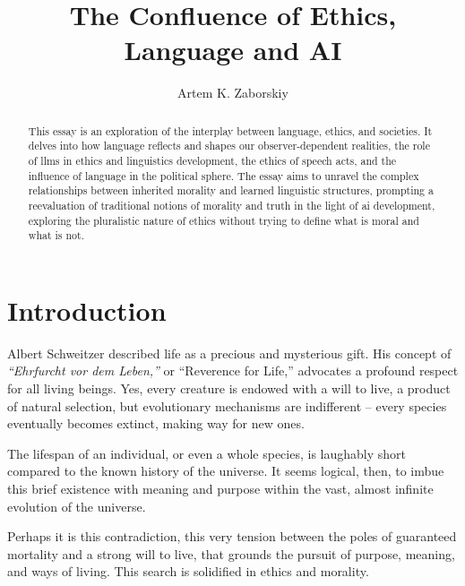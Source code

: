 \documentclass[11pt,a4]{article}
\begin{document}
\title{The Confluence of Ethics, Language and AI}

\author{Artem K. Zaborskiy}


\maketitle




\begin{abstract}



This essay is an exploration of the interplay between language, ethics,
and societies. It delves into how language reflects and shapes our
observer-dependent realities, the role of \glspl{llm} in ethics and
linguistics development, the ethics of speech acts, and the influence
of language in the political sphere. The essay aims to unravel the
complex relationships between inherited morality and learned linguistic
structures, prompting a reevaluation of traditional notions of
morality and truth in the light of \gls{ai} development,
exploring the pluralistic nature of ethics without trying
to define what is moral and what is not.
\end{abstract}

\newpage
\tableofcontents
\printglossaries



\newpage

\section{Introduction}

    Albert Schweitzer described life as a precious and mysterious
    gift\cite{Schweitzer}. His concept of \textit{“Ehrfurcht vor dem Leben,”}
    or “Reverence for Life,” advocates a profound respect for all living beings.
    Yes, every creature is endowed with a will to live, a product of
    natural selection, but evolutionary mechanisms are indifferent
    – every species eventually becomes extinct, making way for new ones.
    \par
    The lifespan of an individual, or even a whole species, is
    laughably short compared to the known history of the universe.
    It seems logical, then, to imbue this brief existence with
    meaning and purpose within the vast, almost infinite
    evolution of the universe.
    \par
    Perhaps it is this contradiction, this very tension
    between the poles of guaranteed mortality and a
    strong will to live, that grounds the pursuit of
    purpose, meaning, and ways of living. This search
    is solidified in ethics and morality.
\end{document}
